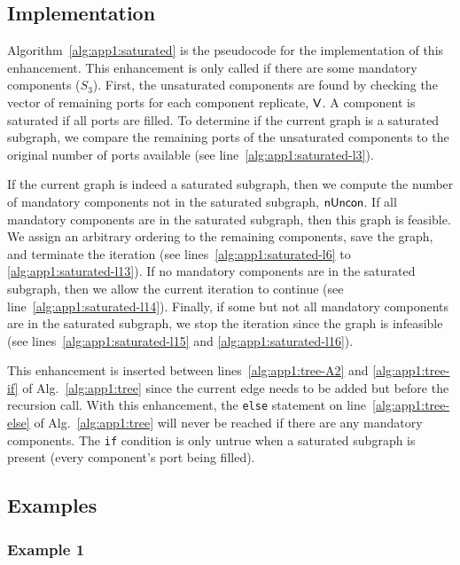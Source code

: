 \subsection{Implementation}



Algorithm~\ref{alg:app1:saturated} is the pseudocode for the implementation of this enhancement.
This enhancement is only called if there are some mandatory components ($S_3$).
First, the unsaturated components are found by checking the vector of remaining ports for each component replicate, $\textup{\textsf{V}}$. A component is saturated if all ports are filled.
To determine if the current graph is a saturated subgraph, we compare the remaining ports of the unsaturated components to the original number of ports available (see line~\ref{alg:app1:saturated-l3}).

If the current graph is indeed a saturated subgraph, then we compute the number of mandatory components not in the saturated subgraph, $\textup{\textsf{nUncon}}$.
If all mandatory components are in the saturated subgraph, then this graph is feasible. We assign an arbitrary ordering to the remaining components, save the graph, and terminate the iteration (see lines~\ref{alg:app1:saturated-l6} to \ref{alg:app1:saturated-l13}).
If no mandatory components are in the saturated subgraph, then we allow the current iteration to continue (see line~\ref{alg:app1:saturated-l14}).
Finally, if some but not all mandatory components are in the saturated subgraph, we stop the iteration since the graph is infeasible (see lines~\ref{alg:app1:saturated-l15} and \ref{alg:app1:saturated-l16}).

This enhancement is inserted between lines~\ref{alg:app1:tree-A2} and \ref{alg:app1:tree-if} of Alg.~\ref{alg:app1:tree} since the current edge needs to be added but before the recursion call.
With this enhancement, the \texttt{else} statement on line~\ref{alg:app1:tree-else} of Alg.~\ref{alg:app1:tree} will never be reached if there are any mandatory components.
The \texttt{if} condition is only untrue when a saturated subgraph is present (every component's port being filled).

\subsection{Examples}

\subsubsection{Example 1\label{sec:app1:saturated-ex1}}

